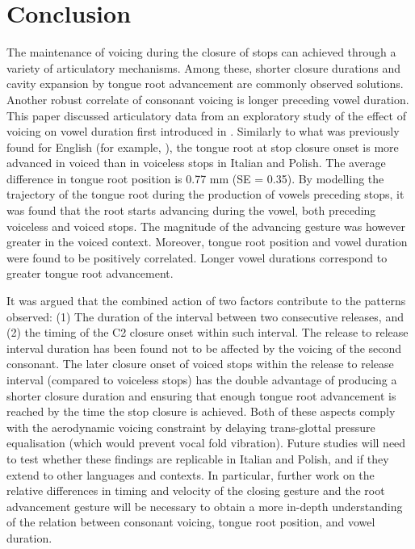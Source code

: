 \documentclass[preprint]{JASAnew}
\begin{document}
\hypertarget{conclusion}{%
\section{Conclusion}\label{conclusion}}

The maintenance of voicing during the closure of stops can achieved
through a variety of articulatory mechanisms. Among these, shorter
closure durations \citep{davis1989} and cavity expansion by tongue root
advancement \citep{westbury1983} are commonly observed solutions.
Another robust correlate of consonant voicing is longer preceding vowel
duration. This paper discussed articulatory data from an exploratory
study of the effect of voicing on vowel duration first introduced in
\citet{coretta2018j}. Similarly to what was previously found for English
(for example, \citealt{westbury1983, ahn2018}), the tongue root at stop
closure onset is more advanced in voiced than in voiceless stops in
Italian and Polish. The average difference in tongue root position is
0.77 mm (SE = 0.35). By modelling the trajectory of the tongue root
during the production of vowels preceding stops, it was found that the
root starts advancing during the vowel, both preceding voiceless and
voiced stops. The magnitude of the advancing gesture was however greater
in the voiced context. Moreover, tongue root position and vowel duration
were found to be positively correlated. Longer vowel durations
correspond to greater tongue root advancement.

It was argued that the combined action of two factors contribute to the
patterns observed: (1) The duration of the interval between two
consecutive releases, and (2) the timing of the C2 closure onset within
such interval. The release to release interval duration has been found
not to be affected by the voicing of the second consonant. The later
closure onset of voiced stops within the release to release interval
(compared to voiceless stops) has the double advantage of producing a
shorter closure duration and ensuring that enough tongue root
advancement is reached by the time the stop closure is achieved. Both of
these aspects comply with the aerodynamic voicing constraint
\citep{ohala2011} by delaying trans-glottal pressure equalisation (which
would prevent vocal fold vibration). Future studies will need to test
whether these findings are replicable in Italian and Polish, and if they
extend to other languages and contexts. In particular, further work on
the relative differences in timing and velocity of the closing gesture
and the root advancement gesture will be necessary to obtain a more
in-depth understanding of the relation between consonant voicing, tongue
root position, and vowel duration.
\end{document}
